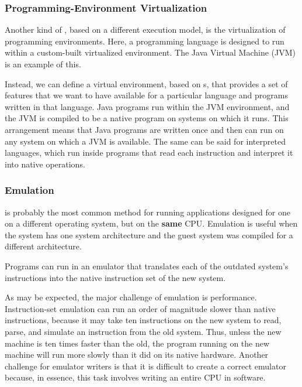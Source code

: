\subsubsection{Programming-Environment Virtualization}\label{subsubsec:Programming_Lang_Virtualization}
Another kind of , based on a different execution model, is the virtualization of programming environments.
Here, a programming language is designed to run within a custom-built virtualized environment.
The Java Virtual Machine (JVM) is an example of this.

Instead, we can define a virtual environment, based on s, that provides a set of features that we want to have available for a particular language and programs written in that language.
Java programs run within the JVM environment, and the JVM is compiled to be a native program on systems on which it runs.
This arrangement means that Java programs are written once and then can run on any system on which a JVM is available.
The same can be said for interpreted languages, which run inside programs that read each instruction and interpret it into native operations.

\subsubsection{Emulation}\label{subsubsec:Emulation}
 is probably the most common method for running applications designed for one  on a different operating system, but on the \textbf{same} CPU.\@
Emulation is useful when the  system has one system architecture and the guest system was compiled for a different architecture.

Programs can run in an emulator that translates each of the outdated system's instructions into the native instruction set of the new system.

As may be expected, the major challenge of emulation is performance.
Instruction-set emulation can run an order of magnitude slower than native instructions, because it may take ten instructions on the new system to read, parse, and simulate an instruction from the old system.
Thus, unless the new machine is ten times faster than the old, the program running on the new machine will run more slowly than it did on its native hardware.
Another challenge for emulator writers is that it is difficult to create a correct emulator because, in essence, this task involves writing an entire CPU in software.

